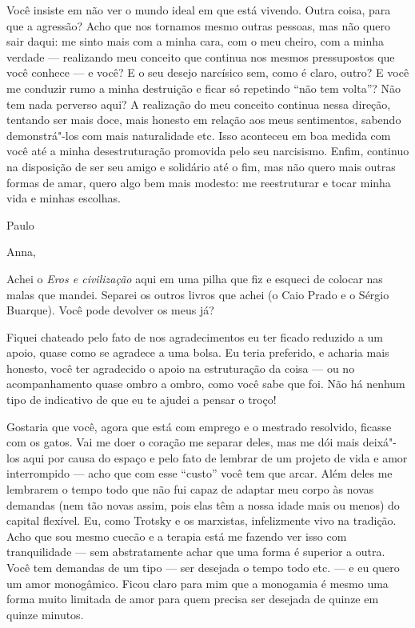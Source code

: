 Você insiste em não ver o mundo ideal em que está vivendo. Outra coisa,
para que a agressão? Acho que nos tornamos mesmo outras pessoas, mas não
quero sair daqui: me sinto mais com a minha cara, com o meu cheiro, com
a minha verdade --- realizando meu conceito que continua nos mesmos
pressupostos que você conhece --- e você? E o seu desejo narcísico sem,
como é claro, outro? E você me conduzir rumo a minha destruição e ficar
só repetindo ``não tem volta''? Não tem nada perverso aqui? A realização
do meu conceito continua nessa direção, tentando ser mais doce, mais
honesto em relação aos meus sentimentos, sabendo demonstrá"-los com mais
naturalidade etc. Isso aconteceu em boa medida com você até a minha
desestruturação promovida pelo seu narcisismo. Enfim, continuo na
disposição de ser seu amigo e solidário até o fim, mas não quero mais
outras formas de amar, quero algo bem mais modesto: me reestruturar e
tocar minha vida e minhas escolhas.

\medskip{} 
\begin{flushright}Paulo\end{flushright}


\asterisc{}

Anna,

\medskip{} 

Achei o \emph{Eros e civilização} aqui em uma pilha que fiz e esqueci de
colocar nas malas que mandei. Separei os outros livros que achei (o Caio
Prado e o Sérgio Buarque). Você pode devolver os meus já?

Fiquei chateado pelo fato de nos agradecimentos eu ter ficado reduzido a
um apoio, quase como se agradece a uma bolsa. Eu teria preferido, e
acharia mais honesto, você ter agradecido o apoio na estruturação da
coisa --- ou no acompanhamento quase ombro a ombro, como você sabe que
foi. Não há nenhum tipo de indicativo de que eu te ajudei a pensar o
troço!

Gostaria que você, agora que está com emprego e o mestrado resolvido,
ficasse com os gatos. Vai me doer o coração me separar deles, mas me dói
mais deixá"-los aqui por causa do espaço e pelo fato de lembrar de um
projeto de vida e amor interrompido --- acho que com esse ``custo'' você
tem que arcar. Além deles me lembrarem o tempo todo que não fui capaz de
adaptar meu corpo às novas demandas (nem tão novas assim, pois elas têm
a nossa idade mais ou menos) do capital flexível. Eu, como Trotsky e os
marxistas, infelizmente vivo na tradição. Acho que sou mesmo cuecão e a
terapia está me fazendo ver isso com tranquilidade --- sem abstratamente
achar que uma forma é superior a outra. Você tem demandas de um tipo ---
ser desejada o tempo todo etc. --- e eu quero um amor monogâmico. Ficou
claro para mim que a monogamia é mesmo uma forma muito limitada de amor
para quem precisa ser desejada de quinze em quinze minutos.

